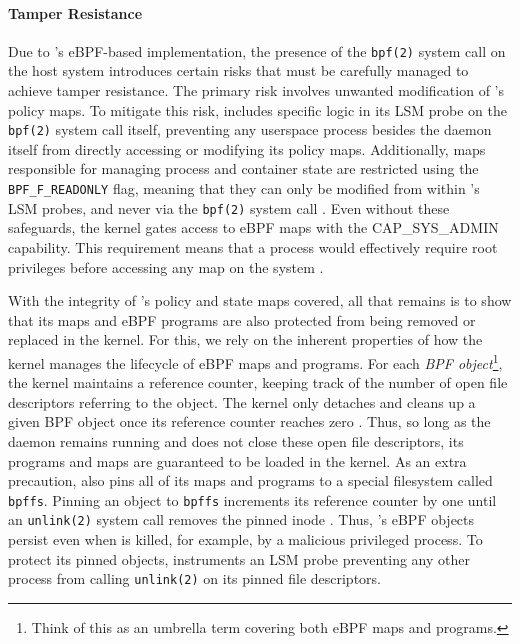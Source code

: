 \paragraph*{Tamper Resistance}

Due to \bpfcontain{}'s eBPF-based implementation, the presence of the \texttt{bpf(2)} system call on the host system introduces certain risks that must be carefully managed to achieve tamper resistance. The primary risk involves unwanted modification of \bpfcontain{}'s policy maps. To mitigate this risk, \bpfcontain{} includes specific logic in its LSM probe on the \texttt{bpf(2)} system call itself, preventing any userspace process besides the \bpfcontain{} daemon itself from directly accessing or modifying its policy maps. Additionally, maps responsible for managing process and container state are restricted using the \texttt{BPF\_F\_READONLY} flag, meaning that they can only be modified from within \bpfcontain{}'s LSM probes, and never via the \texttt{bpf(2)} system call \cite{linux_bpf}. Even without these safeguards, the kernel gates access to eBPF maps with the CAP\_SYS\_ADMIN capability. This requirement means that a process would effectively require root privileges before accessing any map on the system \cite{linux_bpf}.

With the integrity of \bpfcontain{}'s policy and state maps covered, all that remains is to show that its maps and eBPF programs are also protected from being removed or replaced in the kernel. For this, we rely on the inherent properties of how the kernel manages the lifecycle of eBPF maps and programs. For each \textit{BPF object}\footnote{Think of this as an umbrella term covering both eBPF maps and programs.}, the kernel maintains a reference counter, keeping track of the number of open file descriptors referring to the object. The kernel only detaches and cleans up a given BPF object once its reference counter reaches zero \cite{starovoitov2018_lifetime}. Thus, so long as the \bpfcontain{} daemon remains running and does not close these open file descriptors, its programs and maps are guaranteed to be loaded in the kernel. As an extra precaution, \bpfcontain{} also pins all of its maps and programs to a special filesystem called \texttt{bpffs}. Pinning an object to \texttt{bpffs} increments its reference counter by one until an \texttt{unlink(2)} system call removes the pinned inode \cite{starovoitov2018_lifetime}. Thus, \bpfcontain{}'s eBPF objects persist even when \bpfcontain{} is killed, for example, by a malicious privileged process. To protect its pinned objects, \bpfcontain{} instruments an LSM probe preventing any other process from calling \texttt{unlink(2)} on its pinned file descriptors.

